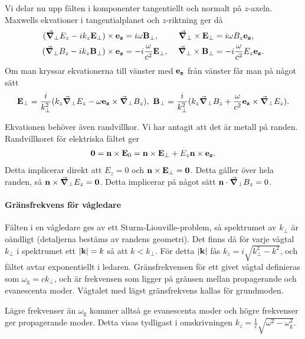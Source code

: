 Vi delar nu upp fälten i komponenter tangentiellt och normalt på $z$-axeln. Maxwells ekvationer i tangentialplanet och $z$-riktning ger då
\begin{alignat*}{3}
	(\gradperp{E_{z}} - ik_{z}\vb{E}_{\perp})\times\ub{z} &= i\omega\vb{B}_{\perp},\      &\gradperp\times\vb{E}_{\perp}            &= i\omega B_{z}\ub{z}, \\
	(\gradperp{B_{z}} - ik_{z}\vb{B}_{\perp})\times\ub{z} &= -i\frac{\omega}{c^{2}}\vb{E}_{\perp},\ &\gradperp\times\vb{B}_{\perp} &= -i\frac{\omega}{c^{2}}E_{z}\ub{z}.
\end{alignat*}
Om man kryssar ekvationerna till vänster med $\vb{e}_{\vb{z}}$ från vänster får man på något sätt
\begin{align*}
	\vb{E}_{\perp} = \frac{i}{k_{\perp}^{2}}(k_{z}\grad_{\perp}{}{E_{z}} - \omega\vb{e}_{\vb{z}}\times\grad_{\perp}{}{B_{z}}),\ \vb{B}_{\perp} = \frac{i}{k_{\perp}^{2}}(k_{z}\grad_{\perp}{}{B_{z}} + \frac{\omega}{c^{2}}\vb{e}_{\vb{z}}\times\grad_{\perp}{}{E_{z}}).
\end{align*}

Ekvationen behöver även randvillkor. Vi har antagit att det är metall på randen. Randvillkoret för elektriska fältet ger
\begin{align*}
	\vb{0} = \vb{n}\times\vb{E}_{0} = \vb{n}\times\vb{E}_{\perp} + E_{z}\vb{n}\times\vb{e}_{\vb{z}}.
\end{align*}
Detta implicerar direkt att $E_{z} = 0$ och $\vb{n}\times\vb{E}_{\perp} = \vb{0}$. Detta gäller över hela randen, så $\vb{n}\times\grad_{\perp}{}{E_{z}} = \vb{0}$. Detta implicerar på något sätt $\vb{n}\cdot\grad_{\perp}{}{B_{z}} = 0$.

\paragraph{Gränsfrekvens för vågledare}
Fälten i en vågledare ges av ett Sturm-Liouville-problem, så spektrumet av $k_{\perp}$ är oändligt (detaljerna bestäms av randens geometri). Det finns då för varje vågtal $k_{\perp}$ i spektrumet ett $\abs{\vb{k}} = k$ så att $k < k_{\perp}$. För detta $\abs{\vb{k}}$ fås $k_{z} = i\sqrt{k_{\perp}^{2} - k^{2}}$, och fältet avtar exponentiellt i ledaren. Gränsfrekvensen för ett givet vågtal definieras som $\omega_{\text{g}} = ck_{\perp}$, och är frekvensen som ligger på gränsen mellan propagerande och evanescenta moder. Vågtalet med lägst gränsfrekvens kallas för grundmoden.

Lägre frekvenser än $\omega_{\text{g}}$ kommer alltså ge evanescenta moder och högre frekvenser ger propagerande moder. Detta visas tydligast i omskrivningen $k_{z} = \frac{1}{c}\sqrt{\omega^{2} - \omega_{\text{g}}^{2}}$.